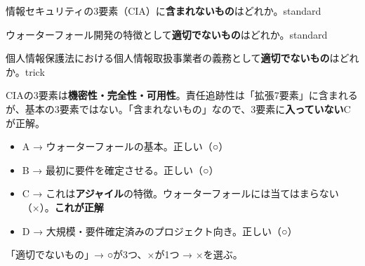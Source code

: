 
\begin{mondai}{情報セキュリティの3要素（CIA）に\textbf{含まれないもの}はどれか。}{standard}
\end{mondai}

\begin{mondai}{ウォーターフォール開発の特徴として\textbf{適切でないもの}はどれか。}{standard}
\end{mondai}

\begin{mondai}{個人情報保護法における個人情報取扱事業者の義務として\textbf{適切でないもの}はどれか。}{trick}
\end{mondai}

\kaitoupage


\begin{kaisetsu}
CIAの3要素は\textbf{機密性・完全性・可用性}。責任追跡性は「拡張7要素」に含まれるが、基本の3要素ではない。「含まれないもの」なので、3要素に\textbf{入っていない}C が正解。
\end{kaisetsu}


\begin{goutoubun}
\begin{itemize}
  \item A → ウォーターフォールの基本。正しい（○）
  \item B → 最初に要件を確定させる。正しい（○）
  \item C → これは\textbf{アジャイル}の特徴。ウォーターフォールには当てはまらない（×）。\textbf{これが正解}
  \item D → 大規模・要件確定済みのプロジェクト向き。正しい（○）
\end{itemize}
「適切でないもの」→ ○が3つ、×が1つ → ×を選ぶ。
\end{goutoubun}

